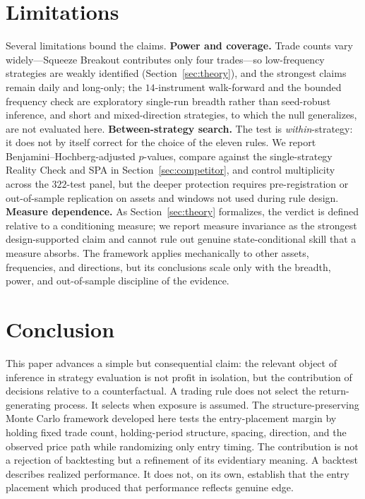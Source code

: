 \documentclass[preprint,12pt]{elsarticle}
\theoremstyle{definition}
\begin{document}
\section{Limitations}

Several limitations bound the claims. \textbf{Power and coverage.} Trade counts vary widely---Squeeze Breakout contributes only four trades---so low-frequency strategies are weakly identified (Section~\ref{sec:theory}), and the strongest claims remain daily and long-only; the $14$-instrument walk-forward and the bounded frequency check are exploratory single-run breadth rather than seed-robust inference, and short and mixed-direction strategies, to which the null generalizes, are not evaluated here. \textbf{Between-strategy search.} The test is \emph{within}-strategy: it does not by itself correct for the choice of the eleven rules. We report Benjamini--Hochberg-adjusted $p$-values, compare against the single-strategy Reality Check and SPA in Section~\ref{sec:competitor}, and control multiplicity across the $322$-test panel, but the deeper protection requires pre-registration or out-of-sample replication on assets and windows not used during rule design. \textbf{Measure dependence.} As Section~\ref{sec:theory} formalizes, the verdict is defined relative to a conditioning measure; we report measure invariance as the strongest design-supported claim and cannot rule out genuine state-conditional skill that a measure absorbs. The framework applies mechanically to other assets, frequencies, and directions, but its conclusions scale only with the breadth, power, and out-of-sample discipline of the evidence.

\section{Conclusion}

This paper advances a simple but consequential claim: the relevant object of inference in strategy evaluation is not profit in isolation, but the contribution of decisions relative to a counterfactual. A trading rule does not select the return-generating process. It selects when exposure is assumed. The structure-preserving Monte Carlo framework developed here tests the entry-placement margin by holding fixed trade count, holding-period structure, spacing, direction, and the observed price path while randomizing only entry timing. The contribution is not a rejection of backtesting but a refinement of its evidentiary meaning. A backtest describes realized performance. It does not, on its own, establish that the entry placement which produced that performance reflects genuine edge.
\end{document}
